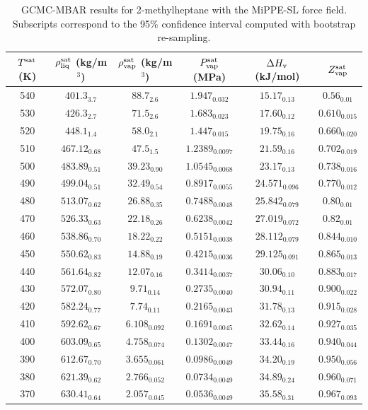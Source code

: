 \documentclass[journal=jctc,manuscript=article]{achemso}
\begin{document}
\begin{table}[htb!]
	\caption{GCMC-MBAR results for 2-methylheptane with the MiPPE-SL force field. Subscripts correspond to the 95\% confidence interval computed with bootstrap re-sampling.}
	\begin{center}
		\begin{tabular}{|c|c|c|c|c|c|}
			\hline
			$T^{\rm sat}$ (K) & $\rho_{\rm liq}^{\rm sat}$ (kg/m$^3$) & $\rho_{\rm vap}^{\rm sat}$ (kg/m$^3$) & $P_{\rm vap}^{\rm sat}$ (MPa) & $\Delta H_{\rm v}$ (kJ/mol) & $Z_{\rm vap}^{\rm sat}$ \\ \hline
			540 & $401.3_{3.7}$ & $88.7_{2.6}$ & $1.947_{0.032}$ & $15.17_{0.13}$ & $0.56_{0.01}$ \\
			530 & $426.3_{2.7}$ & $71.5_{2.6}$ & $1.683_{0.023}$ & $17.60_{0.12}$ & $0.610_{0.015}$ \\
			520 & $448.1_{1.4}$ & $58.0_{2.1}$ & $1.447_{0.015}$ & $19.75_{0.16}$ & $0.660_{0.020}$ \\
			510 & $467.12_{0.68}$ & $47.5_{1.5}$ & $1.2389_{0.0097}$ & $21.59_{0.16}$ & $0.702_{0.019}$ \\
			500 & $483.89_{0.51}$ & $39.23_{0.90}$ & $1.0545_{0.0068}$ & $23.17_{0.13}$ & $0.738_{0.016}$ \\
			490 & $499.04_{0.51}$ & $32.49_{0.54}$ & $0.8917_{0.0055}$ & $24.571_{0.096}$ & $0.770_{0.012}$ \\
			480 & $513.07_{0.62}$ & $26.88_{0.35}$ & $0.7488_{0.0048}$ & $25.842_{0.079}$ & $0.80_{0.01}$ \\
			470 & $526.33_{0.63}$ & $22.18_{0.26}$ & $0.6238_{0.0042}$ & $27.019_{0.072}$ & $0.82_{0.01}$ \\
			460 & $538.86_{0.70}$ & $18.22_{0.22}$ & $0.5151_{0.0038}$ & $28.112_{0.079}$ & $0.844_{0.010}$ \\
			450 & $550.62_{0.83}$ & $14.88_{0.19}$ & $0.4215_{0.0036}$ & $29.125_{0.091}$ & $0.865_{0.013}$ \\
			440 & $561.64_{0.82}$ & $12.07_{0.16}$ & $0.3414_{0.0037}$ & $30.06_{0.10}$ & $0.883_{0.017}$ \\
			430 & $572.07_{0.80}$ & $9.71_{0.14}$ & $0.2735_{0.0040}$ & $30.94_{0.11}$ & $0.900_{0.022}$ \\
			420 & $582.24_{0.77}$ & $7.74_{0.11}$ & $0.2165_{0.0043}$ & $31.78_{0.13}$ & $0.915_{0.028}$ \\
			410 & $592.62_{0.67}$ & $6.108_{0.092}$ & $0.1691_{0.0045}$ & $32.62_{0.14}$ & $0.927_{0.035}$ \\
			400 & $603.09_{0.65}$ & $4.758_{0.074}$ & $0.1302_{0.0047}$ & $33.44_{0.16}$ & $0.940_{0.044}$ \\
			390 & $612.67_{0.70}$ & $3.655_{0.061}$ & $0.0986_{0.0049}$ & $34.20_{0.19}$ & $0.950_{0.056}$ \\
			380 & $621.39_{0.62}$ & $2.766_{0.052}$ & $0.0734_{0.0049}$ & $34.89_{0.24}$ & $0.960_{0.071}$ \\
			370 & $630.41_{0.64}$ & $2.057_{0.045}$ & $0.0536_{0.0049}$ & $35.58_{0.31}$ & $0.967_{0.093}$ \\
			\hline
		\end{tabular}
	\end{center}
\end{table}
\end{document}
